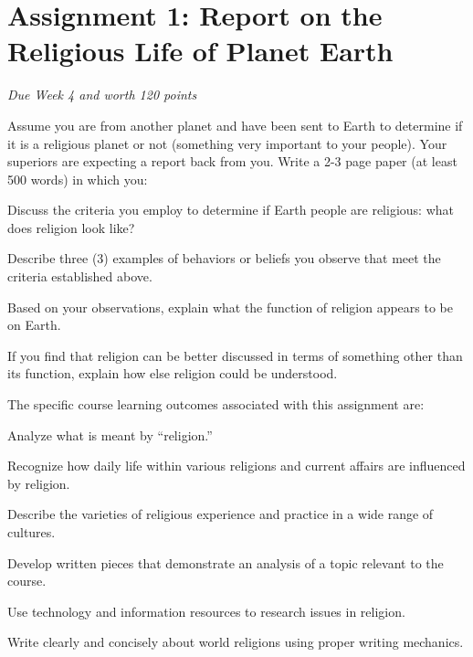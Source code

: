 \pagebreak
\section*{Assignment 1: Report on the Religious Life of Planet Earth}
\emph{Due Week 4 and worth 120 points}

Assume you are from another planet and have been sent to Earth to determine if it is a religious planet or not (something very important to your people). Your superiors are expecting a report back from you. Write a 2-3 page paper (at least 500 words) in which you:
\begin{enumerate*}
	\item Discuss the criteria you employ to determine if Earth people are religious: what does religion look like?
	\item Describe three (3) examples of behaviors or beliefs you observe that meet the criteria established above.
	\item Based on your observations, explain what the function of religion appears to be on Earth.
	\item If you find that religion can be better discussed in terms of something other than its function, explain how else religion could be understood.
\end{enumerate*}

The specific course learning outcomes associated with this assignment are:
\begin{itemize*}
	\item Analyze what is meant by ``religion.''
	\item Recognize how daily life within various religions and current affairs are influenced by religion.
	\item Describe the varieties of religious experience and practice in a wide range of cultures.
	\item Develop written pieces that demonstrate an analysis of a topic relevant to the course.
	\item Use technology and information resources to research issues in religion. 
	\item Write clearly and concisely about world religions using proper writing mechanics.
\end{itemize*}

